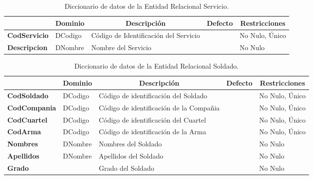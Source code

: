\begin{table}[H]
\centering
\caption{Diccionario de datos de la Entidad Relacional Servicio.}
\label{tab-DiccR-04}
\begin{tabular}{>{\bfseries}m{4.0cm}>{}m{3.0cm}>{}m{6.0cm}>{}m{5.0cm}>{}m{2.0cm}}
\toprule
\multicolumn{1}{c}{\textbf{Atributo}} & \multicolumn{1}{c}{\textbf{Dominio}} & \multicolumn{1}{c}{\textbf{Descripción}} & \multicolumn{1}{c}{\textbf{Defecto}} & \multicolumn{1}{c}{\textbf{Restricciones}} \\ \midrule
CodServicio	    &   DCodigo	    &   Código de Identificación del Servicio	        &	&No Nulo, Único	\\
Descripcion	    &   DNombre	    &   Nombre del Servicio	                            &	&No Nulo	\\\bottomrule
\end{tabular}
\end{table}

\begin{table}[H]
\centering
\caption{Diccionario de datos de la Entidad Relacional Soldado.}
\label{tab-DiccR-05}
\begin{tabular}{>{\bfseries}m{4.0cm}>{}m{3.0cm}>{}m{6.0cm}>{}m{5.0cm}>{}m{2.0cm}}
\toprule
\multicolumn{1}{c}{\textbf{Atributo}} & \multicolumn{1}{c}{\textbf{Dominio}} & \multicolumn{1}{c}{\textbf{Descripción}} & \multicolumn{1}{c}{\textbf{Defecto}} & \multicolumn{1}{c}{\textbf{Restricciones}} \\ \midrule
CodSoldado	    &   DCodigo	    &   Código de identificación del Soldado	    &	&No Nulo, Único	\\
CodCompania	    &   DCodigo	    &   Código de identificación de la Compañia	    &	&No Nulo, Único	\\
CodCuartel	    &   DCodigo	    &   Código de identificación del Cuartel	    &	&No Nulo, Único	\\
CodArma	    &   DCodigo	    &   Código de identificación de la Arma &	&No Nulo, Único	\\
Nombres	        &   DNombre	    &   Nombres del Soldado	        &	&No Nulo	\\
Apellidos       &   DNombre	    &   Apellidos del Soldado	    &	&No Nulo	\\
Grado	        &   	        &   Grado del Soldado	        &	&No Nulo	\\\bottomrule
\end{tabular}
\end{table}

